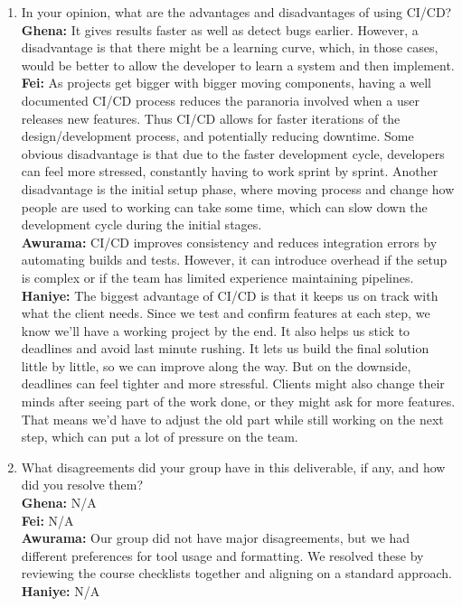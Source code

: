 \documentclass{article}
\begin{document}
\begin{enumerate}
    \item In your opinion, what are the advantages and disadvantages of using
    CI/CD? \\
      \textbf{Ghena:} It gives results faster as well as detect bugs earlier. However, a disadvantage is that there might be a learning curve, which, in those cases, would be better to allow the developer to learn a system and then implement. 
      \\\textbf{Fei:} As projects get bigger with bigger moving components, having a well documented CI/CD process reduces the paranoria involved when a user releases new features. Thus CI/CD allows for faster iterations of the design/development process, and potentially reducing downtime. Some obvious disadvantage is that due to the faster development cycle, developers can feel more stressed, constantly having to work sprint by sprint. Another disadvantage is the initial setup phase, where moving process and change how people are used to working can take some time, which can slow down the development cycle during the initial stages.
     \\\textbf{Awurama:} CI/CD improves consistency and reduces integration errors by 
    automating builds and tests. However, it can introduce overhead if the setup is 
    complex or if the team has limited experience maintaining pipelines.  
    \\\textbf{Haniye:} The biggest advantage of CI/CD is that it keeps us on track with what the client needs. Since we test and confirm features at each step, we know we’ll have a working project by the end. It also helps us stick to deadlines and avoid last minute rushing. It lets us build the final solution little by little, so we can improve along the way. But on the downside, deadlines can feel tighter and more stressful. Clients might also change their minds after seeing part of the work done, or they might ask for more features. That means we’d have to adjust the old part while still working on the next step, which can put a lot of pressure on the team.
    \item What disagreements did your group have in this deliverable, if any,
    and how did you resolve them? \\
    \textbf{Ghena:} N/A
    \\\textbf{Fei:} N/A
    \\\textbf{Awurama:} Our group did not have major disagreements, but we had 
    different preferences for tool usage and formatting. We resolved these by reviewing 
    the course checklists together and aligning on a standard approach.
    \\\textbf{Haniye:} N/A
    
\end{enumerate}
\end{document}
